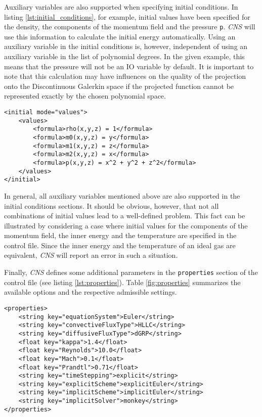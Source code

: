 Auxiliary variables are also supported when specifying initial conditions. In
listing \ref{lst:initial_conditions}, for example, initial values have been
specified for the density, the components of the momentum field and the pressure
\texttt{p}. \emph{CNS} will use this information to calculate the initial energy
automatically. Using an auxiliary variable in the initial conditions is,
however, independent of using an auxiliary variable in the list of polynomial
degrees. In the given example, this means that the pressure will not be an IO
variable by default. It is important to note that this calculation may have
influences on the quality of the projection onto the Discontinuous Galerkin
space if the projected function cannot be represented exactly by the chosen
polynomial space.


\begin{lstlisting}[caption={Specification of initial conditions}, 
label={lst:initial_conditions},float]
<initial mode="values">
	<values>
		<formula>rho(x,y,z) = 1</formula>
		<formula>m0(x,y,z) = y</formula>
		<formula>m1(x,y,z) = z</formula>
		<formula>m2(x,y,z) = x</formula>
		<formula>p(x,y,z) = x^2 + y^2 + z^2</formula>
	</values>
</initial>
\end{lstlisting}

In general, all auxiliary variables mentioned above are also supported in the initial
conditions sections. It should be obvious, however, that not all combinations of
initial values lead to a well-defined problem. This fact can be illustrated by
considering a case where initial values for the components of the momentum field,
the inner energy and the temperature are specified in the control file. Since the inner
energy and the temperature of an ideal gas are equivalent, \emph{CNS} will report
an error in such a situation.

Finally, \emph{CNS} defines some additional parameters in the \texttt{properties}
section of the control file (see listing \ref{lst:properties}). Table
\ref{fig:properties} summarizes the available options and the respective admissible 
settings.

\begin{lstlisting}[caption={Specification of \emph{CNS}-specific properties}, 
label={lst:properties},float]
<properties>
	<string key="equationSystem">Euler</string>
	<string key="convectiveFluxType">HLLC</string>
	<string key="diffusiveFluxType">dGRP</string>
	<float key="kappa">1.4</float>
	<float key="Reynolds">10.0</float>
	<float key="Mach">0.1</float>
	<float key="Prandtl">0.71</float>
	<string key="timeStepping">explicit</string>
	<string key="explicitScheme">explicitEuler</string>
	<string key="implicitScheme">implicitEuler</string>
	<string key="implicitSolver">monkey</string>
</properties>
\end{lstlisting}


